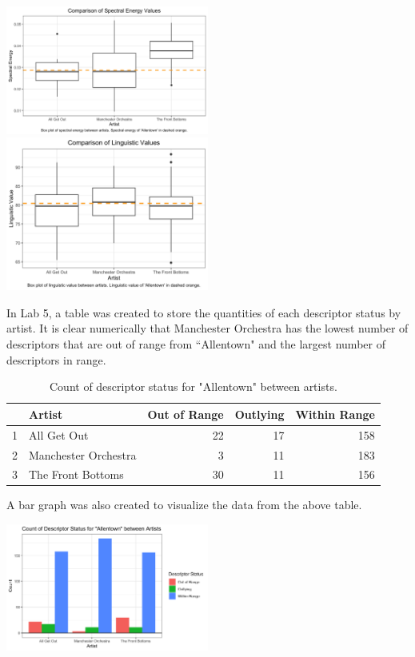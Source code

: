 \documentclass{article}\usepackage[]{graphicx}\usepackage[]{xcolor}
\begin{document}
\begin{multicols}{2}
\begin{center}
  \includegraphics[width=0.5\textwidth]{boxplot_se.png}
  \newpage
  \includegraphics[width=0.5\textwidth]{boxplot_linguistic.png}
\end{center} 

In Lab 5, a table was created to store the quantities of each descriptor status by artist. It is clear numerically that Manchester Orchestra has the lowest number of descriptors that are out of range from ``Allentown" and the largest number of descriptors in range.

\begin{table}[H]
\centering
\scriptsize
\begin{tabular}{rlrrr}
  \hline
 & Artist & Out of Range & Outlying & Within Range \\ 
  \hline
1 & All Get Out &  22 &  17 & 158 \\ 
  2 & Manchester Orchestra &   3 &  11 & 183 \\ 
  3 & The Front Bottoms &  30 &  11 & 156 \\ 
   \hline
\end{tabular}
\caption{Count of descriptor status for "Allentown" between artists.} 
\label{tab:reference}
\end{table}

A bar graph was also created to visualize the data from the above table.

\begin{center}
  \includegraphics[width=0.5\textwidth]{descriptors.png}
\end{center} 


\end{multicols}
\end{document}
